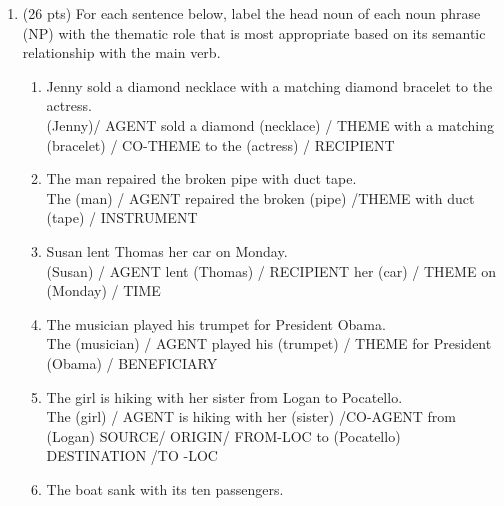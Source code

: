 \documentclass[11pt]{article}
\begin{document}
\begin{enumerate}
\begin{enumerate}
\end{enumerate}

\newpage

\item (26 pts) For each sentence below, label the head noun of each noun
  phrase (NP) with the thematic role that is most appropriate based on its
  semantic relationship with the main verb.  

\begin{enumerate}

\item Jenny sold a diamond necklace with a matching diamond bracelet to
  the actress.  \\ 
  
  (Jenny)/ {AGENT} sold a diamond (necklace) / {THEME} with a matching (bracelet) / {CO-THEME} to the (actress) / {RECIPIENT} \\

\item The man repaired the broken pipe with duct tape.  \\ 

The (man) / {AGENT} repaired the broken (pipe) /{THEME} with duct (tape) / {INSTRUMENT} \\

\item Susan lent Thomas her car on Monday.  \\ 

(Susan) / {AGENT} lent (Thomas) / {RECIPIENT} her (car) / {THEME} on (Monday) / {TIME} \\

\item The musician played his trumpet for President Obama.   \\ 

The (musician) / {AGENT} played his (trumpet) / {THEME} for President (Obama) / {BENEFICIARY} \\

\item The girl is hiking with her sister from Logan to Pocatello. \\ 

The (girl) / {AGENT} is hiking with her (sister) /{CO-AGENT} from (Logan) {SOURCE/ ORIGIN/ FROM-LOC} to (Pocatello) {DESTINATION /TO -LOC } \\

\item The boat sank with its ten passengers.  \\ 


\end{enumerate}
\end{enumerate}
\end{document}

